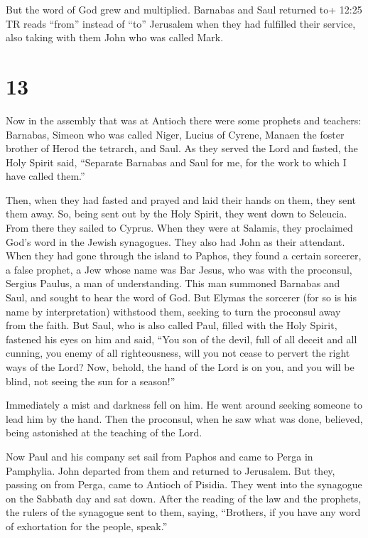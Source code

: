  But the word of God grew and multiplied. 
Barnabas and Saul returned to+ 12:25 TR reads ``from'' instead of ``to''
Jerusalem when they had fulfilled their service, also taking with them
John who was called Mark.

\hypertarget{section-12}{%
\section{13}\label{section-12}}

 Now in the assembly that was at Antioch there were some
prophets and teachers: Barnabas, Simeon who was called Niger, Lucius of
Cyrene, Manaen the foster brother of Herod the tetrarch, and Saul.
 As they served the Lord and fasted, the Holy Spirit said,
``Separate Barnabas and Saul for me, for the work to which I have called
them.''

 Then, when they had fasted and prayed and laid their hands
on them, they sent them away.  So, being sent out by the
Holy Spirit, they went down to Seleucia. From there they sailed to
Cyprus.  When they were at Salamis, they proclaimed God's
word in the Jewish synagogues. They also had John as their attendant.
 When they had gone through the island to Paphos, they found
a certain sorcerer, a false prophet, a Jew whose name was Bar Jesus,
 who was with the proconsul, Sergius Paulus, a man of
understanding. This man summoned Barnabas and Saul, and sought to hear
the word of God.  But Elymas the sorcerer (for so is his
name by interpretation) withstood them, seeking to turn the proconsul
away from the faith.  But Saul, who is also called Paul,
filled with the Holy Spirit, fastened his eyes on him  and
said, ``You son of the devil, full of all deceit and all cunning, you
enemy of all righteousness, will you not cease to pervert the right ways
of the Lord?  Now, behold, the hand of the Lord is on you,
and you will be blind, not seeing the sun for a season!''

Immediately a mist and darkness fell on him. He went around seeking
someone to lead him by the hand.  Then the proconsul, when
he saw what was done, believed, being astonished at the teaching of the
Lord.

 Now Paul and his company set sail from Paphos and came to
Perga in Pamphylia. John departed from them and returned to Jerusalem.
 But they, passing on from Perga, came to Antioch of
Pisidia. They went into the synagogue on the Sabbath day and sat down.
 After the reading of the law and the prophets, the rulers
of the synagogue sent to them, saying, ``Brothers, if you have any word
of exhortation for the people, speak.''

